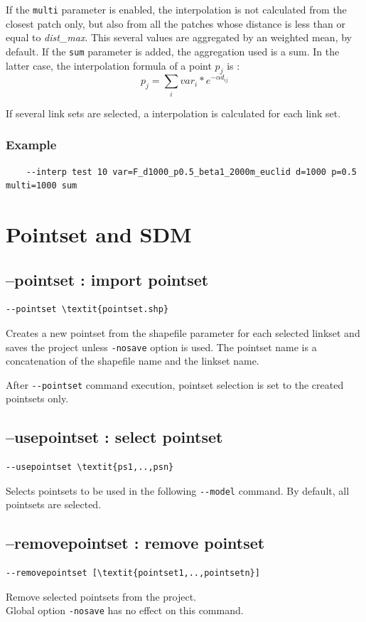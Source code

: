 \documentclass[a4paper,10pt]{report}
\begin{document}
If the \verb|multi| parameter is enabled, the interpolation is not calculated from the closest patch only, but also from all the patches whose distance is less than or equal to \textit{dist\_max}. This several values are aggregated by an weighted mean, by default. If the \verb|sum| parameter is added, the aggregation used is a sum. In the latter case, the interpolation formula of a point $p_j$ is :
$$p_j = \sum_i{var_i * e^{-\alpha d_{ij}}} $$

If several link sets are selected, a interpolation is calculated for each link set.

\subsubsection{Example}
\begin{Verbatim}
	--interp test 10 var=F_d1000_p0.5_beta1_2000m_euclid d=1000 p=0.5 multi=1000 sum
\end{Verbatim}


\section{Pointset and SDM}
\subsection{--pointset : import pointset}
\begin{Verbatim}[commandchars=\\\{\}]
--pointset \textit{pointset.shp}
\end{Verbatim}
Creates a new pointset from the shapefile parameter for each selected linkset and saves the project unless \verb|-nosave| option is used.
The pointset name is a concatenation of the shapefile name and the linkset name.

After \verb|--pointset| command execution, pointset selection is set to the created pointsets only.

\subsection{--usepointset : select pointset}
\begin{Verbatim}[commandchars=\\\{\}]
--usepointset \textit{ps1,..,psn}
\end{Verbatim}
Selects pointsets to be used in the following \verb|--model| command.
By default, all pointsets are selected.

\subsection{--removepointset : remove pointset}
\begin{Verbatim}[commandchars=\\\{\}]
--removepointset [\textit{pointset1,..,pointsetn}]
\end{Verbatim}
Remove selected pointsets from the project.\\
Global option \verb|-nosave| has no effect on this command.
\end{document}
